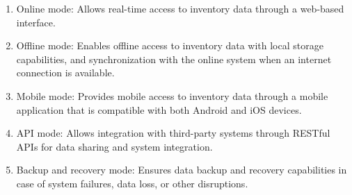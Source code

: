 \begin{enumerate}

    \item Online mode: Allows real-time access to inventory data through a web-based interface.

    \item Offline mode: Enables offline access to inventory data with local storage capabilities, and synchronization with the online system when an internet connection is available.

    \item Mobile mode: Provides mobile access to inventory data through a mobile application that is compatible with both Android and iOS devices.

    \item API mode: Allows integration with third-party systems through RESTful APIs for data sharing and system integration.

    \item Backup and recovery mode: Ensures data backup and recovery capabilities in case of system failures, data loss, or other disruptions.
\end{enumerate}

